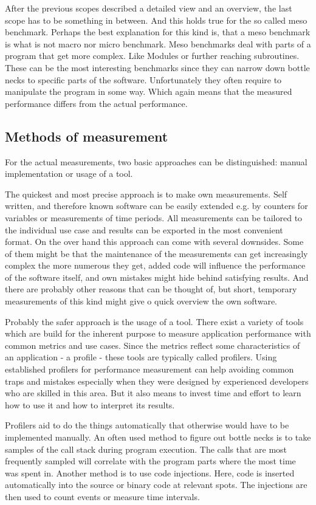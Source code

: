 After the previous scopes described a detailed view and an overview, the last scope has to be something in between. And this holds true for the so called meso benchmark. Perhaps the best explanation for this kind is, that a meso benchmark is what is not macro nor micro benchmark. Meso benchmarks deal with parts of a program that get more complex. Like Modules or further reaching subroutines. These can be the most interesting benchmarks since they can narrow down bottle necks to specific parts of the software. Unfortunately they often require to manipulate the program in some way. Which again means that the measured performance differs from the actual performance.


\subsection{Methods of measurement}
\label{BenchMethods}
For the actual measurements, two basic approaches can be distinguished: manual implementation or usage of a tool.

The quickest and most precise approach is to make own measurements. Self written, and therefore known software can be easily extended e.g. by counters for variables or measurements of time periods. All measurements can be tailored to the individual use case and results can be exported in the most convenient format. On the over hand this approach can come with several downsides. Some of them might be that the maintenance of the measurements can get increasingly complex the more numerous they get, added code will influence the performance of the software itself, and own mistakes might hide behind satisfying results. And there are probably other reasons that can be thought of, but short, temporary measurements of this kind might give o quick overview the own software.

Probably the safer approach is the usage of a tool. There exist a variety of tools which are build for the inherent purpose to measure application performance with common metrics and use cases. Since the metrics reflect some characteristics of an application - a profile - these tools are typically called profilers. Using established profilers for performance measurement can help avoiding common traps and mistakes especially when they were designed by experienced developers who are skilled in this area. But it also means to invest time and effort to learn how to use it and how to interpret its results.

Profilers aid to do the things automatically that otherwise would have to be implemented manually. An often used method to figure out bottle necks is to take samples of the call stack during program execution. The calls that are most frequently sampled will correlate with the program parts where the most time was spent in. Another method is to use code injections. Here, code is inserted automatically into the source or binary code at relevant spots. The injections are then used to count events or measure time intervals.

